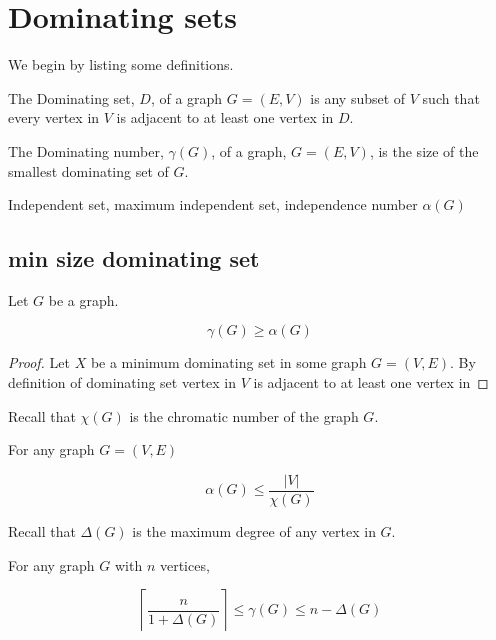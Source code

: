 \chapter{Dominating sets}\label{sec:domSet}

We begin by listing some definitions.

\begin{definition}
    The Dominating set, $D$, of a graph $G=(E,V)$ is any subset of $V$ such that every vertex in $V$ is adjacent to at least one vertex in $D$.
\end{definition}

\begin{definition}
    The Dominating number, $\gamma(G)$, of a graph, $G=(E,V)$, is the size of the smallest dominating set of $G$.
\end{definition}

\begin{definition}
    Independent set, maximum independent set, independence number $\alpha(G)$
\end{definition}

\section{min size dominating set}

\begin{lemma}
    Let $G$ be a graph. 
        
    \[\gamma(G) \geq \alpha(G)\]
\end{lemma}

\begin{proof}
    Let $X$ be a minimum dominating set in some graph $G=(V,E)$. By definition of dominating set vertex in $V$ is adjacent to at least one vertex in      
\end{proof}
    
Recall that $\chi(G)$ is the chromatic number of the graph $G$.

\begin{theorem}  \label{willis3.1}
    For any graph $G = (V,E)$ 

    \[\alpha(G) \leq \frac{ \left | {V} \right |}{\chi(G)}\]
\end{theorem}

Recall that $\Delta(G)$ is the maximum degree of any vertex in $G$.

\begin{theorem}  \label{balakrishnan10.3.2}
    For any graph $G$ with $n$ vertices, 
    
    \[ \left\lceil {\frac{n}{1+\Delta(G)}} \right\rceil \leq \gamma(G) \leq n - \Delta(G)\]    
\end{theorem}
    
